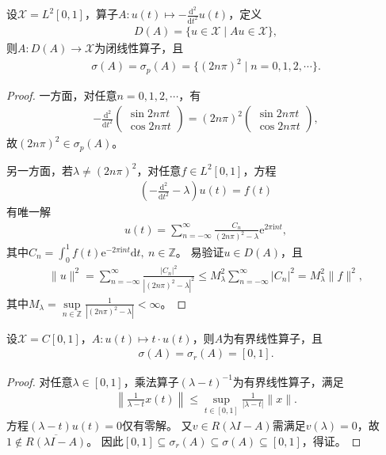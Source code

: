 \documentclass[../../main.tex]{subfiles}%
\begin{document}
\begin{example}
设$\mathscr{X}=L^2[0,1]$，算子$A:u(t)\mapsto -\frac{\mathrm{d}^2}{\mathrm{d}t^2}u(t)$，定义
\begin{align*}
D(A)=\{u\in\mathscr{X}\mid Au\in\mathscr{X}\},
\end{align*}
则$A:D(A)\to\mathscr{X}$为闭线性算子，且
\begin{align*}
\sigma(A)=\sigma_p(A)=\{(2n\pi)^2\mid n=0,1,2,\cdots\}.
\end{align*}
\begin{proof}

一方面，对任意$n=0,1,2,\cdots$，有
\begin{align*}
-\frac{\mathrm{d}^2}{\mathrm{d}t^2}\begin{pmatrix}\sin2n\pi t\\\cos2n\pi t\end{pmatrix}=(2n\pi)^2\begin{pmatrix}\sin2n\pi t\\\cos2n\pi t\end{pmatrix},
\end{align*}
故$(2n\pi)^2\in\sigma_p(A)$。

另一方面，若$\lambda\neq(2n\pi)^2$，对任意$f\in L^2[0,1]$，方程
\begin{align*}
\left(-\frac{\mathrm{d}^2}{\mathrm{d}t^2}-\lambda\right)u(t)=f(t)
\end{align*}
有唯一解
\begin{align*}
u(t)=\sum\limits_{n=-\infty}^{\infty}\frac{C_n}{(2n\pi)^2-\lambda}\mathrm{e}^{2\pi\mathrm{i}nt},
\end{align*}
其中$C_n=\int_{0}^{1}f(t)\mathrm{e}^{-2\pi\mathrm{i}nt}\mathrm{d}t,\ n\in\mathbb{Z}$。
易验证$u\in D(A)$，且
\begin{align*}
\|u\|^2=\sum\limits_{n=-\infty}^{\infty}\frac{|C_n|^2}{|(2n\pi)^2-\lambda|^2}\leqslant M_{\lambda}^2\sum\limits_{n=-\infty}^{\infty}|C_n|^2=M_{\lambda}^2\|f\|^2,
\end{align*}
其中$M_{\lambda}=\sup\limits_{n\in\mathbb{Z}}\frac{1}{|(2n\pi)^2-\lambda|}<\infty$。

\end{proof}
\end{example}

\begin{example}
设$\mathscr{X}=C[0,1]$，$A:u(t)\mapsto t\cdot u(t)$，则$A$为有界线性算子，且
\begin{align*}
\sigma(A)=\sigma_r(A)=[0,1].
\end{align*}
\begin{proof}

对任意$\lambda\in[0,1]$，乘法算子$(\lambda-t)^{-1}$为有界线性算子，满足
\begin{align*}
\left\|\frac{1}{\lambda-t}x(t)\right\|\leqslant\sup\limits_{t\in[0,1]}\frac{1}{|\lambda-t|}\|x\|.
\end{align*}
方程$(\lambda-t)u(t)=0$仅有零解。
又$v\in R(\lambda I-A)$需满足$v(\lambda)=0$，故$1\notin\overline{R(\lambda I-A)}$。
因此$[0,1]\subseteq\sigma_r(A)\subseteq\sigma(A)\subseteq[0,1]$，得证。

\end{proof}
\end{example}
\end{document}
